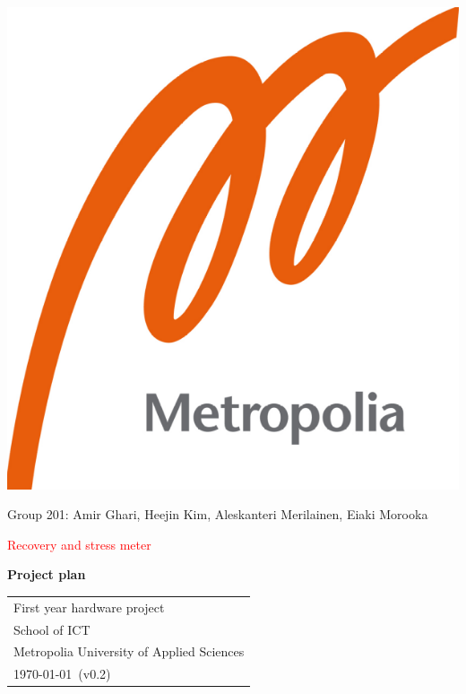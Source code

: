 \documentclass{article}
\begin{document}
\begin{center}
\includegraphics[scale=0.2]{logo.png}
\end{center}

\vspace{0.5cm}

\begin{center}

 Group 201: Amir Ghari, Heejin Kim, Aleskanteri Merilainen, Eiaki Morooka \\

\vspace{0.5cm}

{\Huge \textcolor{red}{Recovery and stress meter}} \\


\vspace{0.5cm}

{\Large \textbf{Project plan}} \\


\end{center}

\vspace{1cm}

\begin{center}

{\Large }



\begin{tabular}{l}
 First year hardware project \\
 School of ICT\\
 Metropolia University of Applied Sciences  \\
 \today \, (v0.2)
\end{tabular}
\end{center}
\end{document}
